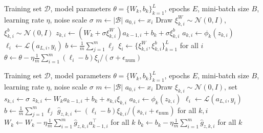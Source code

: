 \begin{algorithm}[htbp]
\caption{Weight perturbation (WP)}
\label{alg:wp_training}
\begin{algorithmic}[1]\algorithmicrowspacing
\Require Training set \(\mathcal{D}\), model parameters \(\theta=\{W_k,b_k\}_{k=1}^{L}\), epochs \(E\), mini-batch size \(B\), learning rate \(\eta\), noise scale \(\sigma\)
        \State \(m \gets |\mathcal{B}|\)
            \State \(a_{0,i}\gets x_i\)
                \State Draw \(\xi^W_{k,i}\sim\mathcal{N}(0,I)\), \(\xi^b_{k,i}\sim\mathcal{N}(0,I)\)
                \State \(z_{k,i}\gets (W_k+\sigma\xi^W_{k,i})a_{k-1,i}+b_k+\sigma\xi^b_{k,i}\)
                \State \(a_{k,i}\gets \phi_k(z_{k,i})\)
            \EndFor
            \State \(\ell_i\gets \mathcal{L}(a_{L,i},y_i)\)
        \EndFor
        \State \(b\gets \frac{1}{m}\sum_{j=1}^{m}\ell_j\)
        \State \(\xi_i\gets\{\xi^W_{k,i},\xi^b_{k,i}\}_{k=1}^{L}\) for all \(i\)
        \State \(\theta\gets \theta-\eta\frac{1}{m}\sum_{i=1}^{m}(\ell_i-b)\xi_i/(\sigma+\epsilon_{\mathrm{num}})\)
    \EndFor
\EndFor
\end{algorithmic}
\end{algorithm}

\begin{algorithm}[htbp]
\caption{Vanilla node perturbation with fixed pre-activation noise}
\label{alg:vanilla_np_training}
\begin{algorithmic}[1]\algorithmicrowspacing
\Require Training set \(\mathcal{D}\), model parameters \(\theta=\{W_k,b_k\}_{k=1}^{L}\), epochs \(E\), mini-batch size \(B\), learning rate \(\eta\), noise scale \(\sigma\)
        \State \(m \gets |\mathcal{B}|\)
            \State \(a_{0,i}\gets x_i\)
                \State Draw \(\xi_{k,i}\sim\mathcal{N}(0,I)\), set \(s_{k,i}\gets\sigma\)
                \State \(z_{k,i}\gets W_k a_{k-1,i}+b_k+s_{k,i}\xi_{k,i}\)
                \State \(a_{k,i}\gets \phi_k(z_{k,i})\)
            \EndFor
            \State \(\ell_i\gets \mathcal{L}(a_{L,i},y_i)\)
        \EndFor
        \State \(b\gets \frac{1}{m}\sum_{j=1}^{m}\ell_j\)
        \State \(\widehat{g}_{z,k,i}\gets(\ell_i-b)\xi_{k,i}/(s_{k,i}+\epsilon_{\mathrm{num}})\) for all \(k,i\)
        \State \(W_k\gets W_k-\eta\frac{1}{m}\sum_{i=1}^{m}\widehat{g}_{z,k,i}a_{k-1,i}^{\top}\) for all \(k\)
        \State \(b_k\gets b_k-\eta\frac{1}{m}\sum_{i=1}^{m}\widehat{g}_{z,k,i}\) for all \(k\)
    \EndFor
\EndFor
\end{algorithmic}
\end{algorithm}

